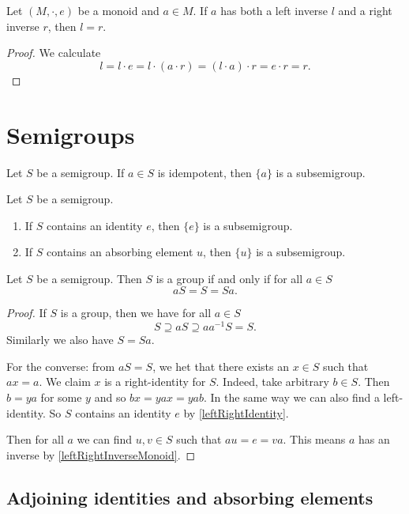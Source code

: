 \begin{proposition} \label{leftRightInverseMonoid}
Let $(M,\cdot,e)$ be a monoid and $a\in M$. If $a$ has both a left inverse $l$ and a right inverse $r$, then $l=r$.
\end{proposition}
\begin{proof}
We calculate
\[ l = l\cdot e = l\cdot(a\cdot r) = (l\cdot a)\cdot r= e\cdot r = r. \]
\end{proof}

\section{Semigroups}
\begin{lemma}
Let $S$ be a semigroup. If $a\in S$ is idempotent, then $\{a\}$ is a subsemigroup.
\end{lemma}
\begin{corollary}
Let $S$ be a semigroup.
\begin{enumerate}
\item If $S$ contains an identity $e$, then $\{e\}$ is a subsemigroup.
\item If $S$ contains an absorbing element $u$, then $\{u\}$ is a subsemigroup.
\end{enumerate}
\end{corollary}

\begin{proposition} \label{groupCriterion}
Let $S$ be a semigroup. Then $S$ is a group \textup{if and only if} for all $a\in S$
\[ aS = S = Sa. \]
\end{proposition}
\begin{proof}
If $S$ is a group, then we have for all $a\in S$
\[ S \supseteq aS \supseteq aa^{-1}S = S. \]
Similarly we also have $S = Sa$.

For the converse: from $aS = S$, we het that there exists an $x\in S$ such that $ax = a$. We claim $x$ is a right-identity for $S$. Indeed, take arbitrary $b\in S$. Then $b = ya$ for some $y$ and so $bx = yax = ya b$. In the same way we can also find a left-identity. So $S$ contains an identity $e$ by \ref{leftRightIdentity}.

Then for all $a$ we can find $u,v\in S$ such that $au = e = va$. This means $a$ has an inverse by \ref{leftRightInverseMonoid}.
\end{proof}


\subsection{Adjoining identities and absorbing elements}
